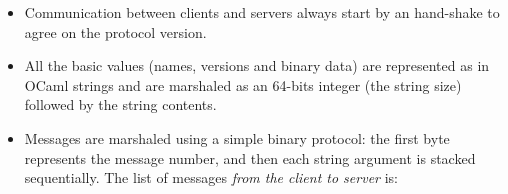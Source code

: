 \documentclass[a4paper,11pt]{article}
\begin{document}
\begin{itemize}

\item Communication between clients and servers always start by an
hand-shake to agree on the protocol version.

\item All the basic values (names, versions and binary data) are
  represented as in OCaml strings and are marshaled as an 64-bits
  integer (the string size) followed by the string contents.

\item Messages are marshaled using a simple binary protocol: the first
  byte represents the message number, and then each string argument is
  stacked sequentially.
  The list of messages {\em from the client to server} is:


\end{itemize}
\end{document}
